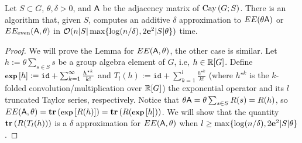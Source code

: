 \begin{lemma}\label{lem:fastEstrada:Cayley}
	Let $S\subset G $, $\theta,\delta >0$, and ${\mathsf{A} }$ be the adjacency matrix of $\operatorname{Cay}\left(G; S\right)$. There is an algorithm that, given $S$, computes an additive $\delta$ approximation to $EE(\theta {\ensuremath{\mathsf{A} }})$ or $EE_{\text{even}}({\mathsf{A} },\theta)$ in $\mathcal{O}(n|S| \max\{ \log (n/\delta) , 2{\mathbf e}^2 |S| \theta \})$ time.
\end{lemma}
\begin{proof}
We will prove the Lemma for $EE({\mathsf{A} },\theta)$, the other case is similar. Let $h:=\theta \sum_{s\in S} s$ be a group algebra element of $G$, i.e, $h\in \mathbb{R} [G]$. Define $\operatorname{\textbf{\footnotesize exp}}\left[h\right] := \mathtt{id} + \sum_{k=1}^{\infty} \frac{h^{\star k}}{k!}$ and $T_l(h):= \mathtt{id} + \sum_{k=1}^{l} \frac{h^{\star k}}{k!}$ (where $h^{\star k}$ is the $k$-folded convolution/multiplication over $\mathbb{R} [G]$) the exponential operator and its $l$ truncated Taylor series, respectively. Notice that $\theta {\ensuremath{\mathsf{A} }}=\theta \sum_{s\in S} R(s) = R(h) $, so $EE({\mathsf{A} },\theta) = \operatorname{\textbf{tr}}\left(\operatorname{\textbf{\footnotesize exp}}\left[R(h)\right]\right)= \operatorname{\textbf{tr}}\left(R(\operatorname{\textbf{\footnotesize exp}}\left[h\right])\right)$. We will show that the quantity $\operatorname{\textbf{tr}}\left(R(T_l(h) )\right)$ is a $\delta$ approximation for $EE({\mathsf{A} },\theta)$ when $l\geq  \max\{ \log (n/\delta) , 2{\mathbf e}^2 |S| \theta\}$.


\end{proof}
